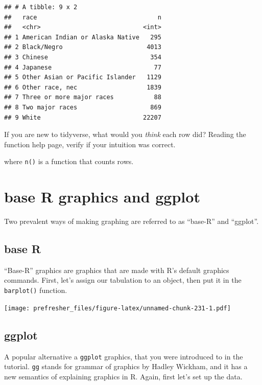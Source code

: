 \documentclass[]{book}
\newenvironment{Shaded}{\begin{snugshade}}{\end{snugshade}}
\newcommand{\KeywordTok}[1]{\textcolor[rgb]{0.13,0.29,0.53}{\textbf{#1}}}
\newcommand{\OperatorTok}[1]{\textcolor[rgb]{0.81,0.36,0.00}{\textbf{#1}}}
\newcommand{\NormalTok}[1]{#1}
\theoremstyle{definition}
\theoremstyle{definition}
\theoremstyle{definition}
\theoremstyle{remark}
\begin{document}
\begin{verbatim}
## # A tibble: 9 x 2
##   race                                 n
##   <chr>                            <int>
## 1 American Indian or Alaska Native   295
## 2 Black/Negro                       4013
## 3 Chinese                            354
## 4 Japanese                            77
## 5 Other Asian or Pacific Islander   1129
## 6 Other race, nec                   1839
## 7 Three or more major races           88
## 8 Two major races                    869
## 9 White                            22207
\end{verbatim}

If you are new to tidyverse, what would you \emph{think} each row did?
Reading the function help page, verify if your intuition was correct.

where \texttt{n()} is a function that counts rows.

\section{base R graphics and ggplot}\label{base-r-graphics-and-ggplot}

Two prevalent ways of making graphing are referred to as ``base-R'' and
``ggplot''.

\subsection{base R}\label{base-r}

``Base-R'' graphics are graphics that are made with R's default graphics
commands. First, let's assign our tabulation to an object, then put it
in the \texttt{barplot()} function.

\begin{Shaded}
\end{Shaded}

\texttt{[image: prefresher\_files/figure-latex/unnamed-chunk-231-1.pdf]}

\subsection{ggplot}\label{ggplot}

A popular alternative a \texttt{ggplot} graphics, that you were
introduced to in the tutorial. \texttt{gg} stands for grammar of
graphics by Hadley Wickham, and it has a new semantics of explaining
graphics in R. Again, first let's set up the data.
\end{document}
